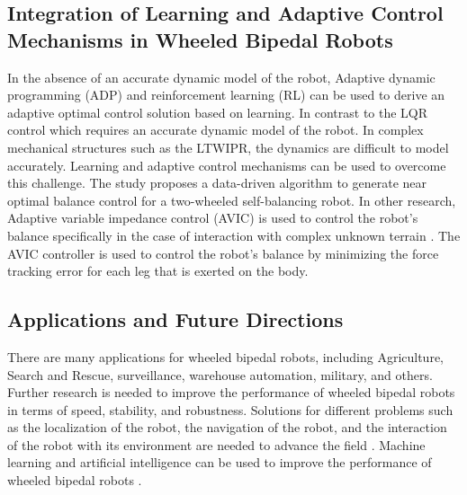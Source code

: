 \subsection{Integration of Learning and Adaptive Control Mechanisms in Wheeled Bipedal Robots}
In the absence of an accurate dynamic model of the robot, Adaptive dynamic programming (ADP) and reinforcement learning (RL) can be used to derive an adaptive optimal control solution based on learning.
In contrast to the LQR control which requires an accurate dynamic model of the robot.
In complex mechanical structures such as the LTWIPR, the dynamics are difficult to model accurately.
Learning and adaptive control mechanisms can be used to overcome this challenge. The study \cite{cui2021learning} proposes a data-driven algorithm to generate near optimal balance control for a two-wheeled self-balancing robot.
In other research, Adaptive variable impedance control (AVIC) is used to control the robot's balance specifically in the case of interaction with complex unknown terrain \cite{xu2020adaptive}.
The AVIC controller is used to control the robot's balance by minimizing the force tracking error for each leg that is exerted on the body.
\subsection{Applications and Future Directions}
There are many applications for wheeled bipedal robots, including Agriculture, Search and Rescue, surveillance, warehouse automation, military, and others.
Further research is needed to improve the performance of wheeled bipedal robots in terms of speed, stability, and robustness.
Solutions for different problems such as the localization of the robot, the navigation of the robot, and the interaction of the robot with its environment are needed to advance the field \cite{raj2022comprehensive}.
Machine learning and artificial intelligence can be used to improve the performance of wheeled bipedal robots \cite{kuutti2020survey}.

